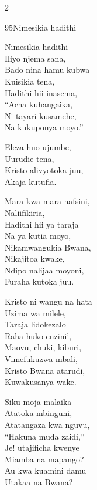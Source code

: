 \documentclass{article}
\begin{document}
\begin{multicols}{2}
\begin{hymn}{95}{Nimesikia hadithi}{}
\begin{stanza}
Nimesikia hadithi\\
Iliyo njema sana,\\
Bado nina hamu kubwa\\
Kuisikia tena,\\
Hadithi hii inasema,\\
``Acha kuhangaika,\\
Ni tayari kusamehe,\\
Na kukuponya moyo.''
\end{stanza}
\begin{chorus}
Eleza huo ujumbe,\\
Uurudie tena,\\
Kristo alivyotoka juu,\\
Akaja kutufia.
\end{chorus}
\begin{stanza}
Mara kwa mara nafsini,\\
Naliifikiria,\\
Hadithi hii ya taraja\\
Na ya kutia moyo,\\
Nikamwangukia Bwana,\\
Nikajitoa kwake,\\
Ndipo nalijaa moyoni,\\
Furaha kutoka juu.
\end{stanza}
\begin{stanza}
Kristo ni wangu na hata\\
Uzima wa milele,\\
Taraja lidokezalo\\
Raha huko enzini',\\
Maovu, chuki, kiburi,\\
Vimefukuzwa mbali,\\
Kristo Bwana atarudi,\\
Kuwakusanya wake.
\end{stanza}
\begin{stanza}
Siku moja malaika\\
Atatoka mbinguni,\\
Atatangaza kwa nguvu,\\
``Hakuna muda zaidi,''\\
Je! utajificha kwenye\\
Miamba na mapango?\\
Au kwa kuamini damu\\
Utakaa na Bwana?
\end{stanza}
\end{hymn}


\end{multicols}
\end{document}
